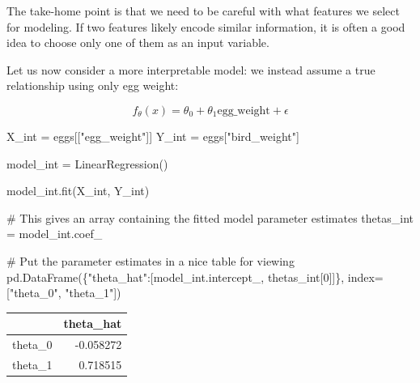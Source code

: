 \documentclass[
  letterpaper,
  DIV=11,
  numbers=noendperiod]{scrreprt}
\newenvironment{Shaded}{\begin{snugshade}}{\end{snugshade}}
\newcommand{\CommentTok}[1]{\textcolor[rgb]{0.37,0.37,0.37}{#1}}
\newcommand{\DecValTok}[1]{\textcolor[rgb]{0.68,0.00,0.00}{#1}}
\newcommand{\NormalTok}[1]{\textcolor[rgb]{0.00,0.23,0.31}{#1}}
\newcommand{\OperatorTok}[1]{\textcolor[rgb]{0.37,0.37,0.37}{#1}}
\newcommand{\StringTok}[1]{\textcolor[rgb]{0.13,0.47,0.30}{#1}}
\begin{document}
The take-home point is that we need to be careful with what features we
select for modeling. If two features likely encode similar information,
it is often a good idea to choose only one of them as an input variable.

Let us now consider a more interpretable model: we instead assume a true
relationship using only egg weight:

\[f_\theta(x) = \theta_0 + \theta_1 \text{egg_weight} + \epsilon\]

\begin{Shaded}
\begin{Highlighting}[]
\NormalTok{X\_int }\OperatorTok{=}\NormalTok{ eggs[[}\StringTok{"egg\_weight"}\NormalTok{]]}
\NormalTok{Y\_int }\OperatorTok{=}\NormalTok{ eggs[}\StringTok{"bird\_weight"}\NormalTok{]}

\NormalTok{model\_int }\OperatorTok{=}\NormalTok{ LinearRegression()}

\NormalTok{model\_int.fit(X\_int, Y\_int)}

\CommentTok{\# This gives an array containing the fitted model parameter estimates}
\NormalTok{thetas\_int }\OperatorTok{=}\NormalTok{ model\_int.coef\_}

\CommentTok{\# Put the parameter estimates in a nice table for viewing}
\NormalTok{pd.DataFrame(\{}\StringTok{"theta\_hat"}\NormalTok{:[model\_int.intercept\_, thetas\_int[}\DecValTok{0}\NormalTok{]]\}, index}\OperatorTok{=}\NormalTok{[}\StringTok{"theta\_0"}\NormalTok{, }\StringTok{"theta\_1"}\NormalTok{])}
\end{Highlighting}
\end{Shaded}

\begin{tabular}{lr}
\toprule
{} &  theta\_hat \\
\midrule
theta\_0 &  -0.058272 \\
theta\_1 &   0.718515 \\
\bottomrule
\end{tabular}
\end{document}
